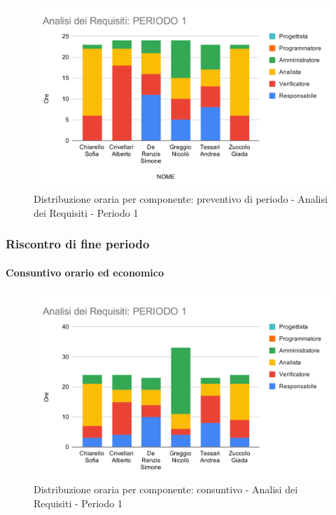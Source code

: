 \begin{figure}[H]
	\centering
	\includegraphics[scale=2]{res/images/charts/preventivo/analisi_1.png}
	\caption{Distribuzione oraria per componente: preventivo di periodo - Analisi dei Requisiti - Periodo 1}
\end{figure}


\subsubsection{Riscontro di fine periodo}


\paragraph{Consuntivo orario ed economico}
\subparagraph*{}

\contabilitaTable{
	
}

\begin{figure}[H]
	\centering
	\includegraphics[scale=2]{res/images/charts/consuntivo/analisi_1.png}
	\caption{Distribuzione oraria per componente: consuntivo - Analisi dei Requisiti - Periodo 1}
\end{figure}

